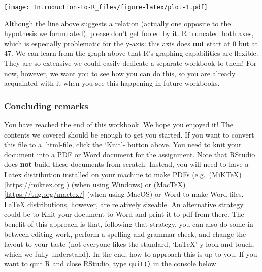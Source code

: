 \documentclass[
]{article}
\newenvironment{Shaded}{\begin{snugshade}}{\end{snugshade}}
\newcommand{\AttributeTok}[1]{\textcolor[rgb]{0.77,0.63,0.00}{#1}}
\newcommand{\CommentTok}[1]{\textcolor[rgb]{0.56,0.35,0.01}{\textit{#1}}}
\newcommand{\DecValTok}[1]{\textcolor[rgb]{0.00,0.00,0.81}{#1}}
\newcommand{\FunctionTok}[1]{\textcolor[rgb]{0.00,0.00,0.00}{#1}}
\newcommand{\NormalTok}[1]{#1}
\newcommand{\SpecialCharTok}[1]{\textcolor[rgb]{0.00,0.00,0.00}{#1}}
\newcommand{\StringTok}[1]{\textcolor[rgb]{0.31,0.60,0.02}{#1}}
\begin{document}
\begin{Shaded}
\end{Shaded}

\texttt{[image: Introduction-to-R\_files/figure-latex/plot-1.pdf]}

Although the line above suggests a relation (actually one opposite to
the hypothesis we formulated), please don't get fooled by it. R
truncated both axes, which is especially problematic for the y-axis:
this axis does \textbf{not} start at 0 but at 47. We can learn from the
graph above that R's graphing capabilities are flexible. They are so
extensive we could easily dedicate a separate workbook to them! For now,
however, we want you to see how you can do this, so you are already
acquainted with it when you see this happening in future workbooks.

\hypertarget{concluding-remarks}{%
\subsubsection{Concluding remarks}\label{concluding-remarks}}

You have reached the end of this workbook. We hope you enjoyed it! The
contents we covered should be enough to get you started. If you want to
convert this file to a .html-file, click the `Knit'- button above. You
need to knit your document into a PDF or Word document for the
assignment. Note that RStudio does \textbf{not} build these documents
from scratch. Instead, you will need to have a Latex distribution
installed on your machine to make PDFs
(e.g.~(MiKTeX){[}\url{https://miktex.org}{]}) (when using Windows) or
(MacTeX){[}\url{https://tug.org/mactex/}{]} (when using MacOS) or Word
to make Word files. LaTeX distributions, however, are relatively
sizeable. An alternative strategy could be to Knit your document to Word
and print it to pdf from there. The benefit of this approach is that,
following that strategy, you can also do some in-between editing work,
perform a spelling and grammar check, and change the layout to your
taste (not everyone likes the standard, `LaTeX'-y look and touch, which
we fully understand). In the end, how to approach this is up to you. If
you want to quit R and close RStudio, type \texttt{quit()} in the
console below.
\end{document}
